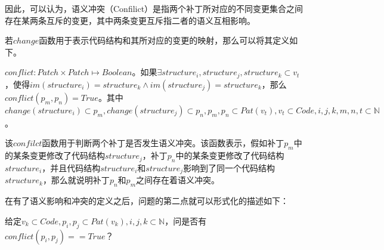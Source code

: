 因此，可以认为，语义冲突（Confilict）是指两个补丁所对应的不同变更集合之间存在某两条互斥的变更，其中两条变更互斥指二者的语义互相影响。

若$change$函数用于表示代码结构和其所对应的变更的映射，那么可以将其定义如下。

%	



\begin{definition}
	$conflict: Patch \times Patch \mapsto Boolean$。如果$\exists structure_i,structure_j,structure_k \subset v_t$，使得$im(structure_i) = structure_k \land im(structure_j) = structure_k$，那么$conflict(p_m,p_n) = True$。其中$change(structure_i) \subset p_m,change(structure_j) \subset p_n,p_m,p_n \subset Pat(v_t),v_t \subset Code,i,j,k,m,n,t \subset \mathbb{N}$。
\end{definition}

该$confilct$函数用于判断两个补丁是否发生语义冲突。该函数表示，假如补丁$p_m$中的某条变更修改了代码结构$structure_j$，补丁$p_n$中的某条变更修改了代码结构$structure_i$，并且代码结构$structure_i$和$structure_j$影响到了同一个代码结构$structure_k$，那么就说明补丁$p_n$和$p_m$之间存在着语义冲突。

在有了语义影响和冲突的定义之后，问题的第二点就可以形式化的描述如下：

	给定$v_k \subset Code, p_i,p_j \subset Pat(v_k),i,j,k \subset \mathbb{N}$，问是否有$conflict(p_i,p_j) == True$？

%

%

